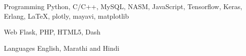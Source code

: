


\begin{cvskills}


\cvskill
{Programming} %
{Python, C/C++, MySQL, NASM, JavaScript, Tensorflow, Keras, Erlang, LaTeX, plotly, mayavi, matplotlib} %


\cvskill
{Web} %
{Flask, PHP, HTML5, Dash} %


\cvskill
{Languages} %
{English, Marathi and Hindi} %


\end{cvskills}